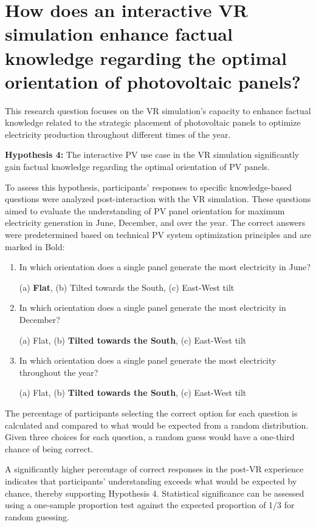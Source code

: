\documentclass[draft, final]{vutinfth} %
\begin{document}

\section{How does an interactive VR simulation enhance factual knowledge regarding the optimal orientation of photovoltaic panels?}

This research question focuses on the VR simulation's capacity to enhance factual knowledge related to the strategic placement of photovoltaic panels to optimize electricity production throughout different times of the year.

\textbf{Hypothesis 4:} The interactive PV use case in the VR simulation significantly gain factual knowledge regarding the optimal orientation of PV panels.

To assess this hypothesis, participants' responses to specific knowledge-based questions were analyzed post-interaction with the VR simulation. These questions aimed to evaluate the understanding of PV panel orientation for maximum electricity generation in June, December, and over the year. The correct answers were predetermined based on technical PV system optimization principles and are marked in Bold:
\begin{enumerate}
    \item In which orientation does a single panel generate the most electricity in June?
    
    (a) \textbf{Flat}, (b) Tilted towards the South, (c) East-West tilt
    \item In which orientation does a single panel generate the most electricity in December?
    
    (a) Flat, (b) \textbf{Tilted towards the South}, (c) East-West tilt
    \item In which orientation does a single panel generate the most electricity throughout the year?
    
    (a) Flat, (b) \textbf{Tilted towards the South}, (c) East-West tilt
\end{enumerate}
The percentage of participants selecting the correct option for each question is calculated and compared to what would be expected from a random distribution. Given three choices for each question, a random guess would have a one-third chance of being correct. 

A significantly higher percentage of correct responses in the post-VR experience indicates that participants' understanding exceeds what would be expected by chance, thereby supporting Hypothesis 4. Statistical significance can be assessed using a one-sample proportion test against the expected proportion of 1/3 for random guessing.
\end{document}
